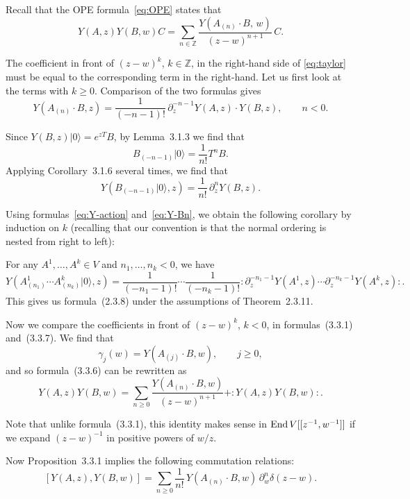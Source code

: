 \documentclass[12pt]{article}
\begin{document}
Recall that the OPE formula~\eqref{eq:OPE} states that
\[
    Y(A,z)Y(B,w)C = \sum_{n\in\mathbb{Z}} \frac{Y(A_{(n)}\cdot B,\,w)}{(z-w)^{n+1}}\,C.
\]

The coefficient in front of $(z-w)^k$, $k\in\mathbb{Z}$, in the right-hand side of \eqref{eq:taylor} must be equal to the corresponding term in the right-hand.
Let us first look at the terms with $k\ge0$.
Comparison of the two formulas gives
\begin{equation}\label{eq:Y-action}
    Y(A_{(n)}\cdot B, z)
    = \frac{1}{(-n-1)!}\,\partial_z^{-n-1}Y(A,z)\cdot Y(B,z),
    \qquad n<0.
\end{equation}

Since $Y(B,z)|0\rangle = e^{zT}B$, by Lemma~3.1.3 we find that
\[
    B_{(-n-1)}|0\rangle = \frac{1}{n!}T^nB.
\]
Applying Corollary~3.1.6 several times, we find that
\begin{equation}\label{eq:Y-Bn}
    Y(B_{(-n-1)}|0\rangle,z)
    = \frac{1}{n!}\,\partial_z^n Y(B,z).
\end{equation}

Using formulas~\eqref{eq:Y-action} and~\eqref{eq:Y-Bn}, we obtain the following corollary by induction on $k$ (recalling that our convention is that the normal ordering is nested from right to left):

\begin{corollary}[3.3.5]
    For any $A^1,\dots,A^k\in V$ and $n_1,\dots,n_k<0$, we have
    \[
        Y(A^1_{(n_1)}\cdots A^k_{(n_k)}|0\rangle,z)
        = \frac{1}{(-n_1-1)!}\cdots\frac{1}{(-n_k-1)!}
        :\partial_z^{-n_1-1}Y(A^1,z)\cdots\partial_z^{-n_k-1}Y(A^k,z):.
    \]
    This gives us formula~(2.3.8) under the assumptions of Theorem~2.3.11.
\end{corollary}


Now we compare the coefficients in front of $(z-w)^k$, $k<0$, in formulas~(3.3.1) and~(3.3.7).
We find that
\[
    \gamma_j(w) = Y(A_{(j)}\cdot B, w), \qquad j\ge0,
\]
and so formula~(3.3.6) can be rewritten as
\begin{equation}\label{eq:ope-positive}
    Y(A,z)Y(B,w)
    = \sum_{n\ge0} \frac{Y(A_{(n)}\cdot B, w)}{(z-w)^{n+1}}
    + :Y(A,z)Y(B,w):.
\end{equation}

Note that unlike formula~(3.3.1), this identity makes sense in $\operatorname{End} V[[z^{-1},w^{-1}]]$ if we expand $(z-w)^{-1}$ in positive powers of $w/z$.

Now Proposition~3.3.1 implies the following commutation relations:
\begin{equation}\label{eq:Y-commutator}
    [Y(A,z),Y(B,w)]
    = \sum_{n\ge0}\frac{1}{n!}\,Y(A_{(n)}\cdot B,w)\,\partial_w^n\delta(z-w).
\end{equation}
\end{document}
